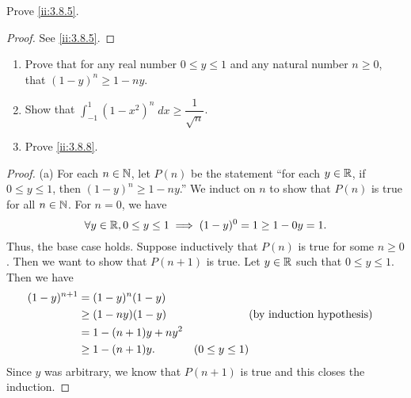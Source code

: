 \exercisesection

\begin{ex}\label{ii:ex:3.8.1}
  Prove \cref{ii:3.8.5}.
\end{ex}

\begin{proof}
  See \cref{ii:3.8.5}.
\end{proof}

\begin{ex}\label{ii:ex:3.8.2}
  \quad
  \begin{enumerate}
    \item Prove that for any real number \(0 \leq y \leq 1\) and any natural number \(n \geq 0\), that \((1 - y)^n \geq 1 - ny\).
    \item Show that \(\int_{-1}^1 (1 - x^2)^n \; dx \geq \dfrac{1}{\sqrt{n}}\).
    \item Prove \cref{ii:3.8.8}.
  \end{enumerate}
\end{ex}

\begin{proof}{(a)}
  For each \(n \in \mathbb{N}\), let \(P(n)\) be the statement ``for each \(y \in \mathbb{R}\), if \(0 \leq y \leq 1\), then \((1 - y)^n \geq 1 - ny\).''
  We induct on \(n\) to show that \(P(n)\) is true for all \(n \in \mathbb{N}\).
  For \(n = 0\), we have
  \[
    \forall y \in \mathbb{R}, 0 \leq y \leq 1 \implies (1 - y)^0 = 1 \geq 1 - 0y = 1.
  \]
  Thus, the base case holds.
  Suppose inductively that \(P(n)\) is true for some \(n \geq 0\).
  Then we want to show that \(P(n + 1)\) is true.
  Let \(y \in \mathbb{R}\) such that \(0 \leq y \leq 1\).
  Then we have
  \begin{align*}
    (1 - y)^{n + 1} & = (1 - y)^n (1 - y)                                \\
                    & \geq (1 - ny) (1 - y)  &                   & \text{(by induction hypothesis)} \\
                    & = 1 - (n + 1)y + n y^2                             \\
                    & \geq 1 - (n + 1)y.     & (0 \leq y \leq 1)
  \end{align*}
  Since \(y\) was arbitrary, we know that \(P(n + 1)\) is true and this closes the induction.
\end{proof}

